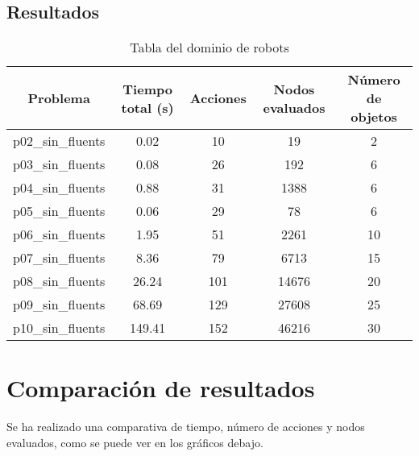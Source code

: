 \documentclass{article}
\begin{document}
\subsection{Resultados}
\begin{table}[h]
    \centering
    \begin{tabular}{|c|c|c|c|c|}
    \hline
    \textbf{Problema} & \textbf{Tiempo total (s)} & \textbf{Acciones} & \textbf{Nodos evaluados} & \textbf{Número de objetos} \\ \hline
    p02\_sin\_fluents               & 0.02                       & 10                 & 19                        & 2                           \\ \hline
    p03\_sin\_fluents               & 0.08                       & 26                 & 192                       & 6                           \\ \hline
    p04\_sin\_fluents               & 0.88                       & 31                 & 1388                      & 6                           \\ \hline
    p05\_sin\_fluents               & 0.06                       & 29                 & 78                        & 6                           \\ \hline
    p06\_sin\_fluents               & 1.95                       & 51                 & 2261                      & 10                          \\ \hline
    p07\_sin\_fluents               & 8.36                       & 79                 & 6713                      & 15                          \\ \hline
    p08\_sin\_fluents               & 26.24                      & 101                & 14676                     & 20                          \\ \hline
    p09\_sin\_fluents               & 68.69                      & 129                & 27608                     & 25                          \\ \hline
    p10\_sin\_fluents               & 149.41                     & 152                & 46216                     & 30                          \\ \hline
    \end{tabular}
    \caption{Tabla del dominio de robots}
    \label{tabla:dominio_robots}
\end{table}

\section{Comparación de resultados}
Se ha realizado una comparativa de tiempo, número de acciones y nodos evaluados, como se puede ver en los gráficos debajo. 
\end{document}
